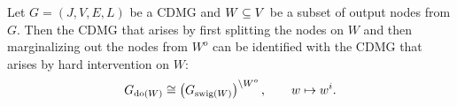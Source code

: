 \documentclass[main]{subfiles}
\begin{document}
\def\rowref{claim\_3\_19}
\label{claim_3_19}
%

\begin{Lem}
     Let $G=(J,V,E,L)$ be a CDMG and $W \subseteq V$ be a subset of output nodes from $G$.
     Then the CDMG that arises by first splitting the nodes on $W$
      and then marginalizing out the nodes from $W^o$
     can be identified with the CDMG that arises by hard intervention on $W$:
     \[ G_{\operatorname{do}(W)} \cong \left ( G_{\mathrm{swig}(W)}\right )^{\setminus W^o}, \qquad w \mapsto w^i. \]
\end{Lem}
\end{document}
